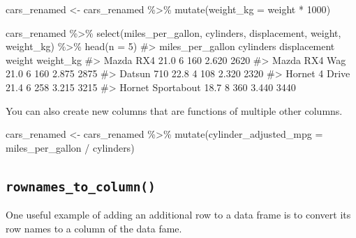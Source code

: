 \documentclass[
  letterpaper,
  DIV=11,
  numbers=noendperiod]{scrreprt}
\newenvironment{Shaded}{\begin{snugshade}}{\end{snugshade}}
\newcommand{\AttributeTok}[1]{\textcolor[rgb]{0.40,0.45,0.13}{#1}}
\newcommand{\CommentTok}[1]{\textcolor[rgb]{0.37,0.37,0.37}{#1}}
\newcommand{\DecValTok}[1]{\textcolor[rgb]{0.68,0.00,0.00}{#1}}
\newcommand{\FunctionTok}[1]{\textcolor[rgb]{0.28,0.35,0.67}{#1}}
\newcommand{\NormalTok}[1]{\textcolor[rgb]{0.00,0.23,0.31}{#1}}
\newcommand{\OtherTok}[1]{\textcolor[rgb]{0.00,0.23,0.31}{#1}}
\newcommand{\SpecialCharTok}[1]{\textcolor[rgb]{0.37,0.37,0.37}{#1}}
\begin{document}
\begin{Shaded}
\begin{Highlighting}[]
\NormalTok{cars\_renamed }\OtherTok{\textless{}{-}}\NormalTok{ cars\_renamed }\SpecialCharTok{\%\textgreater{}\%} 
  \FunctionTok{mutate}\NormalTok{(}\AttributeTok{weight\_kg =}\NormalTok{ weight }\SpecialCharTok{*} \DecValTok{1000}\NormalTok{)}

\NormalTok{cars\_renamed }\SpecialCharTok{\%\textgreater{}\%} 
  \FunctionTok{select}\NormalTok{(miles\_per\_gallon, cylinders, displacement, weight, weight\_kg) }\SpecialCharTok{\%\textgreater{}\%} 
  \FunctionTok{head}\NormalTok{(}\AttributeTok{n =} \DecValTok{5}\NormalTok{)}
\CommentTok{\#\textgreater{}                   miles\_per\_gallon cylinders displacement weight weight\_kg}
\CommentTok{\#\textgreater{} Mazda RX4                     21.0         6          160  2.620      2620}
\CommentTok{\#\textgreater{} Mazda RX4 Wag                 21.0         6          160  2.875      2875}
\CommentTok{\#\textgreater{} Datsun 710                    22.8         4          108  2.320      2320}
\CommentTok{\#\textgreater{} Hornet 4 Drive                21.4         6          258  3.215      3215}
\CommentTok{\#\textgreater{} Hornet Sportabout             18.7         8          360  3.440      3440}
\end{Highlighting}
\end{Shaded}

You can also create new columns that are functions of multiple other
columns.

\begin{Shaded}
\begin{Highlighting}[]
\NormalTok{cars\_renamed }\OtherTok{\textless{}{-}}\NormalTok{ cars\_renamed }\SpecialCharTok{\%\textgreater{}\%} 
  \FunctionTok{mutate}\NormalTok{(}\AttributeTok{cylinder\_adjusted\_mpg =}\NormalTok{ miles\_per\_gallon }\SpecialCharTok{/}\NormalTok{ cylinders)}
\end{Highlighting}
\end{Shaded}

\subsection{\texorpdfstring{\texttt{rownames\_to\_column()}}{rownames\_to\_column()}}\label{rownames_to_column}

One useful example of adding an additional row to a data frame is to
convert its row names to a column of the data fame.
\end{document}
